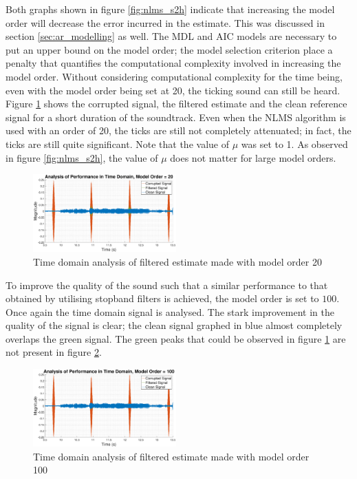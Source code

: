 \documentclass{article}
\begin{document}
Both graphs shown in figure \ref{fig:nlms_s2h} indicate that increasing the model order will decrease the error incurred in the estimate. This was discussed in section \ref{sec:ar_modelling} as well. The MDL and AIC models are necessary to put an upper bound on the model order; the model selection criterion place a penalty that quantifies the computational complexity involved in increasing the model order. Without considering computational complexity for the time being, even with the model order being set at 20, the ticking sound can still be heard.\\

Figure \ref{fig:nlms_s2h_1} shows the corrupted signal, the filtered estimate and the clean reference signal for a short duration of the soundtrack. Even when the NLMS algorithm is used with an order of 20, the ticks are still not completely attenuated; in fact, the ticks are still quite significant. Note that the value of $\mu$ was set to 1. As observed in figure \ref{fig:nlms_s2h}, the value of $\mu$ does not matter for large model orders.

\begin{figure}[H]
    \centering
    \includegraphics[width=0.49\textwidth]{s2h_time_domain_order_20}
    \caption{Time domain analysis of filtered estimate made with model order 20}
    \label{fig:nlms_s2h_1}
\end{figure}

To improve the quality of the sound such that a similar performance to that obtained by utilising stopband filters is achieved, the model order is set to $100$. Once again the time domain signal is analysed. The stark improvement in the quality of the signal is clear; the clean signal graphed in blue almost completely overlaps the green signal. The green peaks that could be observed in figure \ref{fig:nlms_s2h_1} are not present in figure \ref{fig:nlms_s2h_2}.

\begin{figure}[H]
    \centering
    \includegraphics[width=0.49\textwidth]{s2h_time_domain_order_100}
    \caption{Time domain analysis of filtered estimate made with model order 100}
    \label{fig:nlms_s2h_2}
\end{figure}
\end{document}
